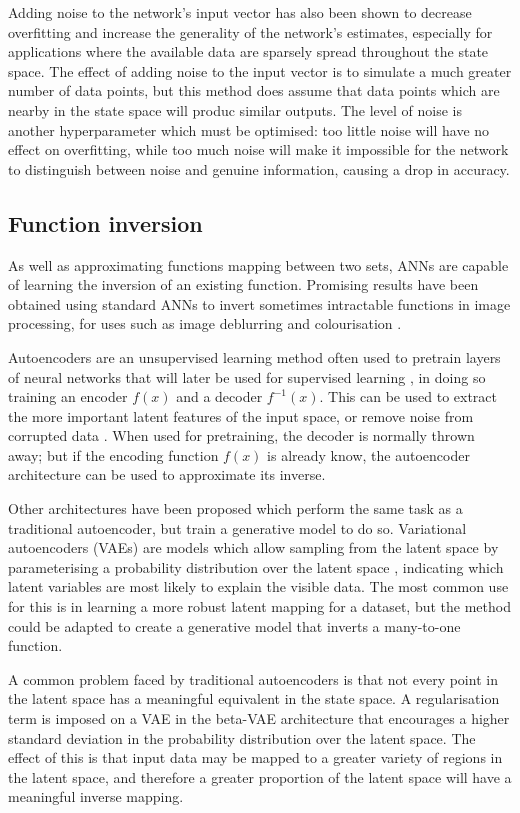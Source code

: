 \documentclass[a4paper]{article}
\begin{document}
Adding noise to the network's input vector \cite{zur09} has also been shown to decrease overfitting and increase the generality of the network's estimates,
especially for applications where the available data are sparsely spread throughout the state space.
The effect of adding noise to the input vector is to simulate a much greater number of data points, but this method does
assume that data points which are nearby in the state space will produc similar outputs.
The level of noise is another hyperparameter which must be optimised: too little noise will have no effect on overfitting,
while too much noise will make it impossible for the network to distinguish between noise and genuine information, causing a drop in accuracy.

\subsection{Function inversion}

As well as approximating functions mapping between two sets, ANNs are capable of learning the inversion of an existing function.
Promising results have been obtained using standard ANNs to invert sometimes intractable functions in image processing,
for uses such as image deblurring \cite{nah18} and colourisation \cite{nguyen16}.

Autoencoders are an unsupervised learning method often used to pretrain layers of neural networks that will later be used for supervised learning \cite{rumelhart86},
in doing so training an encoder $f(x)$ and a decoder $f^{-1}(x)$.
This can be used to extract the more important latent features of the input space, or remove noise from corrupted data \cite{vincent08}.
When used for pretraining, the decoder is normally thrown away; but if the encoding function $f(x)$ is already know, the autoencoder architecture can be used to approximate its inverse.

Other architectures have been proposed which perform the same task as a traditional autoencoder, but train a generative model to do so.
Variational autoencoders (VAEs) are models which allow sampling from the latent space by parameterising a probability distribution over the latent space \cite{kingma14},
indicating which latent variables are most likely to explain the visible data.
The most common use for this is in learning a more robust latent mapping for a dataset, but the method could be adapted to create a generative model that inverts a many-to-one function.

A common problem faced by traditional autoencoders is that not every point in the latent space has a meaningful equivalent in the state space.
A regularisation term is imposed on a VAE in the beta-VAE architecture \cite{higgins16} that encourages a higher standard deviation in the probability distribution over the latent space.
The effect of this is that input data may be mapped to a greater variety of regions in the latent space,
and therefore a greater proportion of the latent space will have a meaningful inverse mapping.
\end{document}
